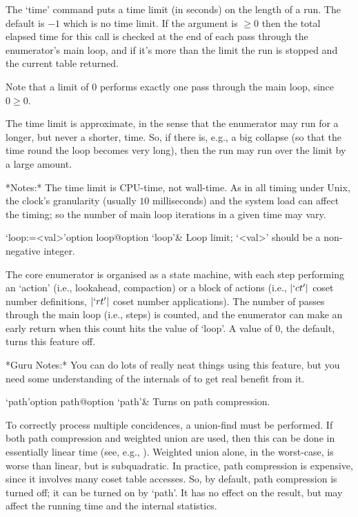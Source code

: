 The `time' command  puts a time limit (in seconds) on  the length of a
run. The default is $-1$  which is no  time limit. If the  argument is
$\ge0$ then the total elapsed time for this call is checked at the end
of each pass through the enumerator's main loop, and if it's more than
the limit the run is stopped and the current table returned.

Note that a limit of $0$ performs exactly one pass  through  the  main
loop, since $0 \ge 0$.

%
%
%

The time  limit is approximate, in  the sense that  the enumerator may
run for a longer, but never a shorter, time.  So, if there is, e.g., a
big collapse (so that the time round the loop becomes very long), then
the run may run over the limit by a large amount.

*Notes:*
The time limit is CPU-time, not wall-time.  As  in  all  timing  under
Unix, the clock's granularity  (usually  $10$  milliseconds)  and  the
system load can  affect  the  timing;  so  the  number  of  main  loop
iterations in a given time may vary.

\>`loop:=<val>'{option loop}@{option `loop'}&
Loop limit; `<val>' should be a non-negative integer.

The core enumerator is organised as a state machine,  with  each  step
performing an \lq{}action' (i.e., lookahead, compaction) or a block of
actions (i.e.,  $|`ct'|$  coset  number  definitions,  $|`rt'|$  coset
number applications). The number  of  passes  through  the  main  loop
(i.e., steps) is counted, and the enumerator can make an early  return
when this count hits the value of `loop'. A value of $0$, the default,
turns this feature off.

*Guru Notes:*
You can do lots of really neat things using this feature, but you need
some understanding of the internals of {\ACE} to get real benefit from
it.

\>`path'{option path}@{option `path'}&
Turns on path compression.

To correctly  process  multiple  concidences,  a  union-find  must  be
performed. If both path compression and weighted union are used,  then
this can be done in essentially linear time (see, e.g., \cite{CLR90}).
Weighted union alone, in the worst-case, is worse than linear, but  is
subquadratic. In practice, path compression  is  expensive,  since  it
involves many coset table accesses. So, by default,  path  compression
is turned off; it can be turned on by `path'. It has no effect on  the
result, but may affect the running time and the internal statistics.

